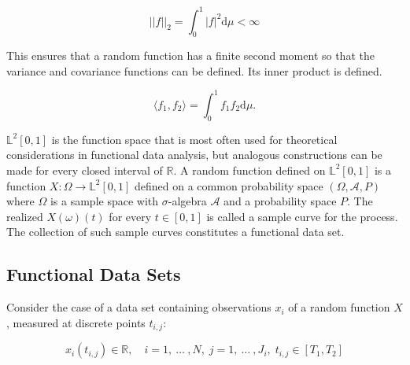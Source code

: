 \documentclass[11pt,twoside,a4paper]{article}
\begin{document}
	\begin{equation}
		\lvert \lvert f \rvert \rvert_2 = \int_{0}^{1} \lvert f \rvert^2 \mathrm{d}\mu < \infty
	\end{equation}
	
	This ensures that a random function has a finite second moment so that the variance and covariance functions can be defined. Its inner product is defined.
	
	\begin{equation}
		\langle f_1, f_2 \rangle = \int_{0}^{1} f_1 f_2 \mathrm{d}\mu.
	\end{equation}
	
	$\mathbb{L}^2[0,1]$ is the function space that is most often used for theoretical considerations in functional data analysis, but analogous constructions can be made for every closed interval of $\mathbb{R}$. 
	A random function defined on $\mathbb{L}^2[0,1]$ is a function $X : \Omega \rightarrow \mathbb{L}^2[0,1]$ defined on a common probability space $(\Omega, \mathcal{A}, P)$ where $\Omega$ is a sample space with $\sigma$-algebra $\mathcal{A}$ and a probability space $P$. The realized $X(\omega)(t)$ for every $t \in [0,1]$ is called a sample curve for the process. The collection of such sample curves constitutes a functional data set.
	
	
	\subsection{Functional Data Sets}
	Consider the case of a data set containing observations $x_i$ of a random function $X$, measured at discrete points $t_{i,j}$: 
	
	\begin{equation}
		x_{i}(t_{i,j}) \in \mathbb{R}, \quad i = 1,\: \dots\: ,N, \; j = 1, \: \dots \:, J_i, \; t_{i,j} \in [T_1, T_2]
	\end{equation}
	
\end{document}
